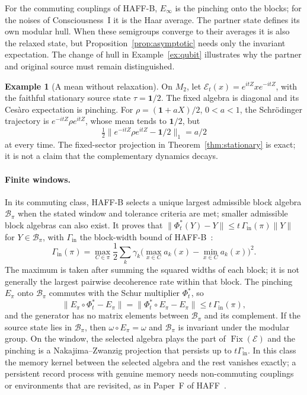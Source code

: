 \documentclass[12pt]{article}
\theoremstyle{definition}
\newtheorem{example}[theorem]{Example}
\theoremstyle{remark}
\newcommand{\Fix}{\operatorname{Fix}}
\begin{document}
For the commuting couplings of HAFF-B, \(E_\infty\) is the pinching onto the blocks; for
the noises of Consciousness~I it is the Haar average. The partner state defines its own modular hull.
When these semigroups converge to their averages it is also the relaxed
state, but Proposition~\ref{prop:asymptotic} needs only the invariant
expectation. The change of hull in Example~\ref{ex:qubit} illustrates
why the partner and original source must remain distinguished.

\begin{example}[A mean without relaxation]\label{ex:mean}
On \(M_2\), let
\(\mathcal E_t(x)=e^{itZ}xe^{-itZ}\), with the faithful stationary
source state \(\tau=\mathbf1/2\). The fixed algebra is diagonal and its
Ces\`aro expectation is pinching. For
\(\rho=(\mathbf1+aX)/2\), \(0<a<1\), the Schr\"odinger trajectory is
\(e^{-itZ}\rho e^{itZ}\), whose mean tends to \(\mathbf1/2\), but
\[
\tfrac12\|e^{-itZ}\rho e^{itZ}-\mathbf1/2\|_1=a/2
\]
at every time. The fixed-sector projection in
Theorem~\ref{thm:stationary} is exact; it is not a claim that the
complementary dynamics decays.
\end{example}

\paragraph{Finite windows.} In its commuting class, HAFF-B selects a unique
largest admissible block algebra \(\mathcal B_\pi\) when the stated
window and tolerance criteria are met; smaller admissible block
algebras can also exist. It proves that
\(\|\Phi_t^*(Y)-Y\|\le t\,\Gamma_{\mathrm{in}}(\pi)\|Y\|\) for \(Y\in\mathcal B_\pi\), with
\(\Gamma_{\mathrm{in}}\) the block-width bound of HAFF-B~\cite{HAFFB}:
\[
\Gamma_{\mathrm{in}}(\pi)
=\max_{C\in\pi}\frac12\sum_k\gamma_k
 \bigl(\max_{x\in C}a_k(x)-\min_{x\in C}a_k(x)\bigr)^2.
\]
The maximum is taken after summing the squared widths of each block; it is
not generally the largest pairwise decoherence rate within that block.
The pinching
\(E_\pi\) onto \(\mathcal B_\pi\) commutes with the Schur multiplier \(\Phi_t^*\), so
\[
\|E_\pi\circ\Phi_t^*-E_\pi\|=\|\Phi_t^*\circ E_\pi-E_\pi\|\le t\,\Gamma_{\mathrm{in}}(\pi),
\]
and the generator has no matrix elements between \(\mathcal B_\pi\) and its complement.
If the source state lies in \(\mathcal B_\pi\), then \(\omega\circ E_\pi=\omega\) and
\(\mathcal B_\pi\) is invariant under the modular group. On the window, the selected
algebra plays the part of \(\Fix(\mathcal E)\) and the pinching is a Nakajima--Zwanzig
projection that persists up to \(t\Gamma_{\mathrm{in}}\). In this class the memory
kernel between the selected algebra and the rest vanishes exactly; a persistent record
process with genuine memory needs non-commuting couplings or environments that are
revisited, as in Paper~F of HAFF~\cite{HAFFF}.
\end{document}
